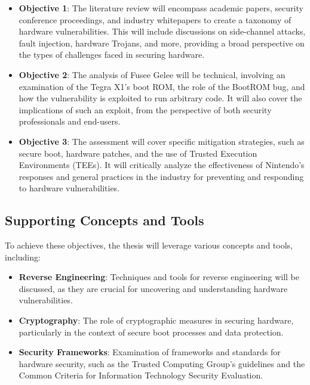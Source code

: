 \begin{itemize}
\item
  \textbf{Objective 1}: The literature review will encompass academic
  papers, security conference proceedings, and industry whitepapers to
  create a taxonomy of hardware vulnerabilities. This will include
  discussions on side-channel attacks, fault injection, hardware
  Trojans, and more, providing a broad perspective on the types of
  challenges faced in securing hardware.
\item
  \textbf{Objective 2}: The analysis of Fusee Gelee will be technical,
  involving an examination of the Tegra X1's boot ROM, the role of the
  BootROM bug, and how the vulnerability is exploited to run arbitrary
  code. It will also cover the implications of such an exploit, from the
  perspective of both security professionals and end-users.
\item
  \textbf{Objective 3}: The assessment will cover specific mitigation
  strategies, such as secure boot, hardware patches, and the use of
  Trusted Execution Environments (TEEs). It will critically analyze the
  effectiveness of Nintendo's responses and general practices in the
  industry for preventing and responding to hardware vulnerabilities.
\end{itemize}

\hypertarget{supporting-concepts-and-tools}{%
\subsection{Supporting Concepts and
Tools}\label{supporting-concepts-and-tools}}

To achieve these objectives, the thesis will leverage various concepts
and tools, including:

\begin{itemize}
\item
  \textbf{Reverse Engineering}: Techniques and tools for reverse
  engineering will be discussed, as they are crucial for uncovering and
  understanding hardware vulnerabilities.
\item
  \textbf{Cryptography}: The role of cryptographic measures in securing
  hardware, particularly in the context of secure boot processes and
  data protection.
\item
  \textbf{Security Frameworks}: Examination of frameworks and standards
  for hardware security, such as the Trusted Computing Group's
  guidelines and the Common Criteria for Information Technology Security
  Evaluation.
\end{itemize}

